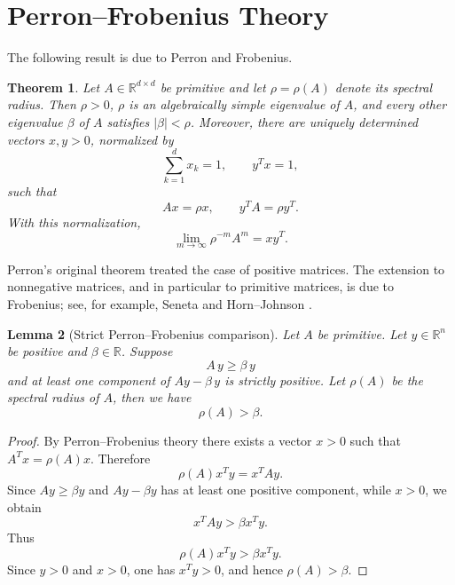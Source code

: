 \documentclass[11pt,reqno]{amsart}
\theoremstyle{plain}
\newtheorem{theorem}{Theorem}[section]
\newtheorem{lemma}[theorem]{Lemma}
\theoremstyle{remark}
\theoremstyle{definition}
\numberwithin{equation}{section}
\begin{document}
\section{\label{a:pf}Perron--Frobenius Theory} %

The following result is due to Perron and Frobenius.
\begin{theorem}\label{th:PF}
Let $ A \in \mathbb{R}^{d \times d}$ be primitive and let \(\rho=\rho(A)\) denote its
spectral radius.  Then \(\rho>0\), \(\rho\) is an algebraically simple
eigenvalue of \(A\), and every other eigenvalue \(\beta \) of \(A\) satisfies
\(|\beta |<\rho\).  Moreover, there are uniquely determined vectors
\(x,y>0\), normalized by
\[
   \sum_{k=1}^{d}x_k=1, \qquad y^T x=1,
\]
such that
\[
   Ax=\rho x, \qquad y^T A=\rho y^T.
\]
With this normalization,
\[
   \lim_{m\to\infty} \rho^{-m}A^m=xy^T.
\]
\end{theorem}
Perron's original theorem treated the case of positive matrices.  The
extension to nonnegative matrices, and in particular to primitive matrices,
is due to Frobenius; see, for example,
Seneta \cite[Theorem~1.1]{Se06} and
Horn--Johnson \cite[Section~8.5]{HJ12}.





















\begin{lemma}[Strict Perron--Frobenius comparison] \label{comparison}
Let $A$ be primitive. Let $ y \in \mathbb{R}^n$ be
positive and $\beta \in \mathbb{R}$. Suppose 
\begin{equation*}
A \, y \geq \beta \, y
\end{equation*}
and at least one component of $Ay-\beta \, y$ is strictly positive. Let $\rho %
\left( A\right) $ be the spectral radius of $A$, then we have
\begin{equation*}
\rho %
\left( A \right) >\beta.
\end{equation*}
\end{lemma}
\begin{proof}
By Perron--Frobenius theory there exists a vector $x>0$ such that
$A^Tx=\rho %
\left( A\right) x$. Therefore
\[
\rho %
\left( A\right) x^Ty=x^TAy.
\]
Since $Ay\ge \beta y$ and $Ay-\beta y$ has at least one positive
component, while $x>0$, we obtain
\[
x^TAy > \beta x^Ty.
\]
Thus
\[
\rho %
\left( A\right) x^Ty > \beta x^Ty.
\]
Since $y>0$ and $x>0$, one has $x^Ty>0$, and hence $\rho
\left( A\right) >\beta$.




\end{proof}
\end{document}
